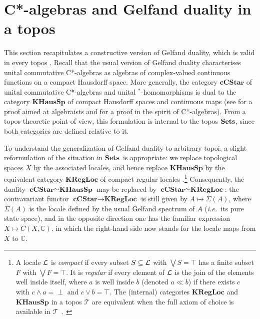 \documentclass[11pt]{article}
\newcommand{\Sets}{\mbox{\textbf{Sets}}}
\newcommand{\ca}{C*-algebra} \newcommand{\jba}{JB-algebra}
\newcommand{\raw}{\rightarrow} \newcommand{\rat}{\mapsto}
\newcommand{\Sg}{\Sigma} \newcommand{\ta}{\tau} \newcommand{\ph}{\phi}
\newcommand{\CT}{{\mathcal T}} \newcommand{\CV}{{\mathcal V}}
\newcommand{\C}{{\mathbb C}} \newcommand{\D}{{\mathbb D}}
\newcommand{\Cat}[1]{\ensuremath{\mathrm{\textbf{#1}}}}
\newcommand{\Ccstar}{\Cat{cCStar}\xspace}
\newcommand{\ie}{\textit{i.e.}}
\begin{document}
\section{\ca s and Gelfand duality in a topos}
\label{sec:constructivecstaralgebra}

This section recapitulates a constructive version of Gelfand duality, which is
 valid in every topos
  \cite{banaschewskimulvey00b,banaschewskimulvey00a,banaschewskimulvey06}.
Recall that the usual version of Gelfand duality characterises
 unital commutative  C*-algebras as algebras of complex-valued continuous
functions on
a compact Hausdorff space. More generally, the category $\Ccstar$ of  unital
commutative  C*-algebras and unital $\mbox{}^*$-homomorphisms is dual to the
category $\Cat{KHausSp}$ of compact Hausdorff spaces and continuous maps (see
\cite{johnstone82} for a proof aimed at algebraists and \cite{NPLCK} for a proof
in the spirit of \ca s). From a topos-theoretic point of view, this formulation
is internal to the topos $\Sets$, since both categories are defined relative to
it.

To understand the generalization of Gelfand duality to arbitrary topoi, a slight
reformulation
of the situation in  \Sets\ is appropriate: we replace topological spaces $X$ by
the associated locales, and hence replace $\Cat{KHausSp}$ by  the
equivalent category  $\Cat{KRegLoc}$ of compact regular locales
\cite{johnstone82}.\footnote{A locale ${\mathcal L}$ is {\it compact} if every
subset $S\subseteq {\mathcal L}$ with $\bigvee S=\top$ has a finite subset $F$
with $\bigvee F=\top$. It is {\it regular} if every element of ${\mathcal L}$
is the join of the elements well inside itself, where $a$ is well
inside $b$ (denoted  $a \ll b$) if there exists $c$ with $c\wedge
a=\perp$ and $c\vee b=\top$. The (internal) categories
$\Cat{KRegLoc}$ and $\Cat{KHausSp}$ in a topos $\CT$ are equivalent
when the full axiom of choice is available in
$\CT$~\cite{johnstone82}. \label{footnote:compactlocale}
} Consequently, the duality $\Ccstar\simeq \Cat{KHausSp}$ may be replaced by
$\Ccstar\simeq \Cat{KRegLoc}$: the contravariant functor $\Ccstar\raw
\Cat{KRegLoc}$
is still given by $A\mapsto \Sigma(A)$, where $\Sg(A)$ is the locale defined by
the usual Gelfand spectrum of $A$ (\ie\ its pure state space), and in the
opposite direction one has
the familiar expression $X\mapsto C(X,\C)$, in which  the right-hand side now
stands for
the locale maps from $X$ to $\C$.
\end{document}
